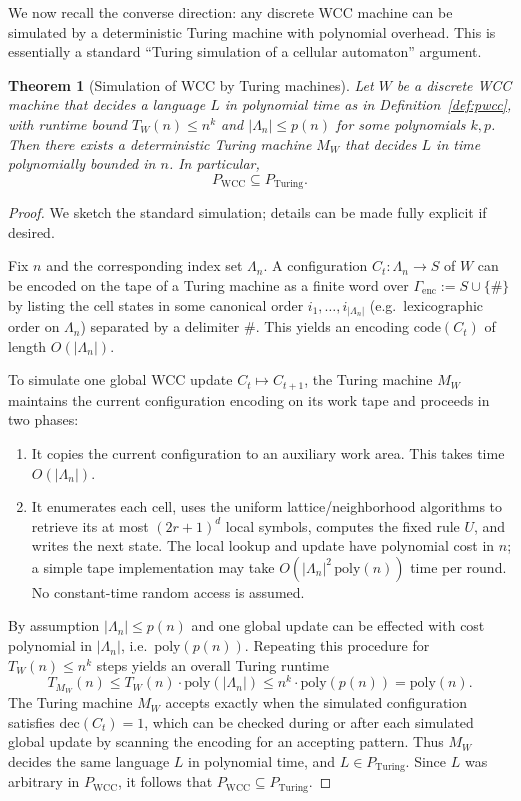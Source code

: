 \documentclass[12pt]{article}
\newtheorem{theorem}{Theorem}[section]
\begin{document}
We now recall the converse direction: any discrete WCC machine can be simulated
by a deterministic Turing machine with polynomial overhead. This is essentially
a standard ``Turing simulation of a cellular automaton'' argument.

\begin{theorem}[Simulation of WCC by Turing machines]
\label{thm:wcc_to_tm}
Let $W$ be a discrete WCC machine that decides a language $L$ in polynomial
time as in Definition~\ref{def:pwcc}, with runtime bound $T_W(n) \le n^k$ and
$|\Lambda_n| \le p(n)$ for some polynomials $k,p$. Then there exists a
deterministic Turing machine $M_W$ that decides $L$ in time polynomially
bounded in $n$. In particular,
\[
P_{\mathrm{WCC}} \subseteq P_{\mathrm{Turing}}.
\]
\end{theorem}

\begin{proof}
We sketch the standard simulation; details can be made fully explicit if
desired.

Fix $n$ and the corresponding index set $\Lambda_n$. A configuration
$C_t : \Lambda_n \to S$ of $W$ can be encoded on the tape of a Turing machine as
a finite word over $\Gamma_{\mathrm{enc}} := S \cup \{\#\}$ by listing the cell
states in some canonical order $i_1,\dots,i_{|\Lambda_n|}$ (e.g.~lexicographic
order on $\Lambda_n$) separated by a delimiter $\#$. This yields an encoding
$\mathrm{code}(C_t)$ of length $O(|\Lambda_n|)$.

To simulate one global WCC update $C_t \mapsto C_{t+1}$, the Turing machine
$M_W$ maintains the current configuration encoding on its work tape and proceeds
in two phases:
\begin{enumerate}
  \item It copies the current configuration to an auxiliary work area. This
    takes time $O(|\Lambda_n|)$.
  \item It enumerates each cell, uses the uniform lattice/neighborhood
    algorithms to retrieve its at most $(2r+1)^d$ local symbols,
    computes the fixed rule $U$, and writes the next state. The local
    lookup and update have polynomial cost in $n$; a simple tape
    implementation may take $O(|\Lambda_n|^2\,\mathrm{poly}(n))$
    time per round. No constant-time random access is assumed.
\end{enumerate}
By assumption $|\Lambda_n| \le p(n)$ and one global update can be effected with
cost polynomial in $|\Lambda_n|$, i.e.~$\mathrm{poly}(p(n))$. Repeating this
procedure for $T_W(n) \le n^k$ steps yields an overall Turing runtime
\[
T_{M_W}(n) \le T_W(n) \cdot \mathrm{poly}(|\Lambda_n|)
\le n^k \cdot \mathrm{poly}(p(n))
= \mathrm{poly}(n).
\]
The Turing machine $M_W$ accepts exactly when the simulated configuration
satisfies $\mathrm{dec}(C_t) = 1$, which can be checked during or after each
simulated global update by scanning the encoding for an accepting pattern. Thus
$M_W$ decides the same language $L$ in polynomial time, and $L \in
P_{\mathrm{Turing}}$. Since $L$ was arbitrary in $P_{\mathrm{WCC}}$, it follows
that $P_{\mathrm{WCC}} \subseteq P_{\mathrm{Turing}}$.
\end{proof}
\end{document}

